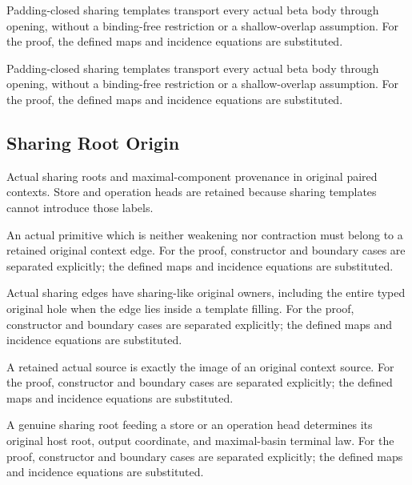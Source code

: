 Padding-closed sharing templates transport every actual beta body through opening, without a binding-free restriction or a shallow-overlap assumption.
For the proof, the defined maps and incidence equations are substituted.
\par{}

Padding-closed sharing templates transport every actual beta body through opening, without a binding-free restriction or a shallow-overlap assumption.
For the proof, the defined maps and incidence equations are substituted.
\par{}

\subsection{Sharing Root Origin}
Actual sharing roots and maximal-component provenance in original paired contexts. Store and operation heads are retained because sharing templates cannot introduce those labels.

An actual primitive which is neither weakening nor contraction must belong to a retained original context edge.
For the proof, constructor and boundary cases are separated explicitly; the defined maps and incidence equations are substituted.
\par{}

Actual sharing edges have sharing-like original owners, including the entire typed original hole when the edge lies inside a template filling.
For the proof, constructor and boundary cases are separated explicitly; the defined maps and incidence equations are substituted.
\par{}

A retained actual source is exactly the image of an original context source.
For the proof, constructor and boundary cases are separated explicitly; the defined maps and incidence equations are substituted.
\par{}

A genuine sharing root feeding a store or an operation head determines its original host root, output coordinate, and maximal-basin terminal law.
For the proof, constructor and boundary cases are separated explicitly; the defined maps and incidence equations are substituted.
\par{}

